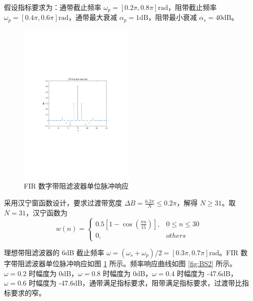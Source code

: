 \documentclass[12pt,AutoFakeBold]{article}
\begin{document}
假设指标要求为：通带截止频率 $\omega_p=[0.2\pi,0.8\pi]\mathrm{rad}$，阻带截止频率 $\omega_p=[0.4\pi,0.6\pi]\mathrm{rad}$，通带最大衰减 $\alpha_p=1\mathrm{dB}$，阻带最小衰减 $\alpha_s=40\mathrm{dB}$。

\begin{figure}[htbp]
	\centering
	\includegraphics[width=0.5\textwidth]{figure/BS1.pdf}
	\caption{FIR 数字带阻滤波器单位脉冲响应} \label{fig:BS1}
\end{figure}

采用汉宁窗函数设计，要求过渡带宽度 $\Delta B=\frac{6.2\pi}{N}\le 0.2\pi$，解得 $N\ge31$。取 $N=31$，汉宁函数为
%
\begin{equation*}
w(n)=\begin{cases}
0.5\left[ 1 - \cos\left(\frac{\pi n}{15}\right) \right], & 0\le n\le 30 \\
0, & others
\end{cases}
\end{equation*}
%

理想带阻滤波器的 6dB 截止频率 $\omega=(\omega_s+\omega_p)/2=[0.3\pi,0.7\pi]\mathrm{rad}$。FIR 数字带阻滤波器单位脉冲响应如图 \ref{fig:BS1} 所示。频率响应曲线如图 \ref{fig:BS2} 所示。$\omega=0.2$ 时幅度为 0dB，$\omega=0.8$ 时幅度为 0dB，$\omega=0.4$ 时幅度为 -47.6dB，$\omega=0.6$ 时幅度为 -47.6dB，通带满足指标要求，阻带满足指标要求，过渡带比指标要求的窄。
\end{document}

